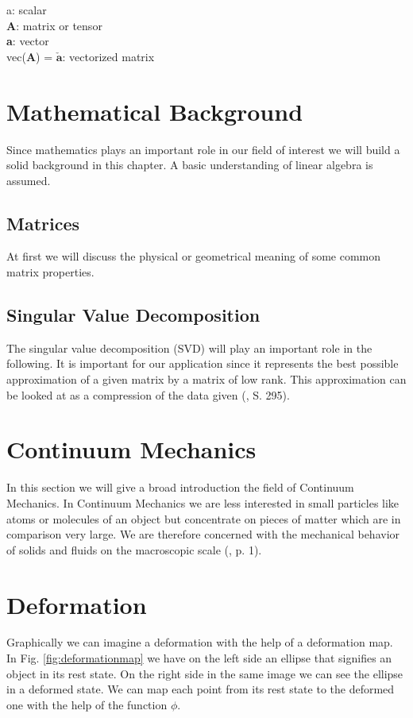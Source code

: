 \begin{addmargin}[2cm]{2cm}
a: scalar \\
\textbf{A}: matrix or tensor \\
\textbf{a}: vector \\
vec(\textbf{A}) = $\boldsymbol{\check{a}}$: vectorized matrix \\
\end{addmargin}

\section{Mathematical Background}

Since mathematics plays an important role in our field of interest we will build a solid background in this chapter. A basic understanding of linear algebra is assumed.

\subsection{Matrices}
At first we will discuss the physical or geometrical meaning of some common matrix properties.


\subsection{Singular Value Decomposition}

The singular value decomposition (SVD) will play an important role in the following. It is important for our application since it represents the best possible approximation of a given matrix by a matrix of low rank. This approximation can be looked at as a compression of the data given (\cite{LiesenMehrmann2015}, S. 295).

\section{Continuum Mechanics}
In this section we will give a broad introduction the field of Continuum Mechanics.
In Continuum Mechanics we are less interested in small particles like atoms or molecules of an object but concentrate on pieces of matter which are in comparison very large. We are therefore concerned with the mechanical behavior of solids and fluids on the macroscopic scale (\cite{Spencer1980}, p. 1).


\section{Deformation}
Graphically we can imagine a deformation with the help of a deformation map. In Fig. \ref{fig:deformationmap} we have on the left side an ellipse that signifies an object in its rest state. On the right side in the same image we can see the ellipse in a deformed state. We can map each point from its rest state to the deformed one with the help of the function $\phi$.

